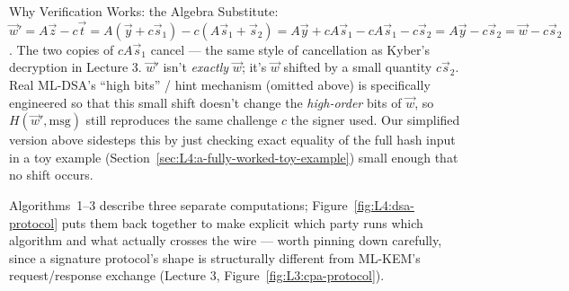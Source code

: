 \begin{rmkbox}{Why Verification Works: the Algebra}
Substitute: $\vec w' = A\vec z - c\vec t = A(\vec y + c\vec s_1) - c(A\vec s_1+\vec s_2) = A\vec y + cA\vec s_1 - cA\vec s_1 - c\vec s_2 = A\vec y - c\vec s_2 = \vec w - c\vec s_2$. The two copies of $cA\vec s_1$ cancel --- the same style of cancellation as Kyber's decryption in Lecture 3. $\vec w'$ isn't \emph{exactly} $\vec w$; it's $\vec w$ shifted by a small quantity $c\vec s_2$. Real ML-DSA's ``high bits'' / hint mechanism (omitted above) is specifically engineered so that this small shift doesn't change the \emph{high-order} bits of $\vec w$, so $H(\vec w', \text{msg})$ still reproduces the same challenge $c$ the signer used. Our simplified version above sidesteps this by just checking exact equality of the full hash input in a toy example (Section~\ref{sec:L4:a-fully-worked-toy-example}) small enough that no shift occurs.
\end{rmkbox}

Algorithms~1--3 describe three separate computations; Figure~\ref{fig:L4:dsa-protocol} puts them back together to make explicit which party runs which algorithm and what actually crosses the wire --- worth pinning down carefully, since a signature protocol's shape is structurally different from ML-KEM's request/response exchange (Lecture 3, Figure~\ref{fig:L3:cpa-protocol}).

